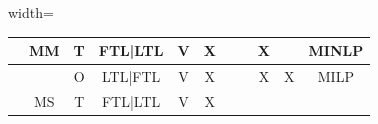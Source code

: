 \begin{table}[!ht]
\begin{adjustbox}{width=\textwidth}
\begin{tabular}{|c|c|c|c|c|c|c|l|c|c|c|}
      \autocite{Berman2006InboundCost}                                                   &
      MM                                                                                 &
      T                                                                                  &
      FTL|LTL                                                                            &
      V                                                                                  &
      X                                                                                  &
                                                                                         &                &
      X                                                                                  &
                                                                                         &
      MINLP                                                                                                                                             \\ \hline
      \autocite{Sancak2011Multi-itemPolicy}                                              &
                                                                                         &
      O                                                                                  &
      LTL|FTL                                                                            &
      V                                                                                  &
      X                                                                                  &
                                                                                         &                &
      X                                                                                  &
      X                                                                                  &
      MILP                                                                                                                                              \\ \hline
      \autocite{Schoneberg2010AnNetworks}                                                &
      MS                                                                                 &
      T                                                                                  &
      FTL|LTL                                                                            &
      V                                                                                  &
      X                                                                                  &

\end{tabular}
\end{adjustbox}
\end{table}
